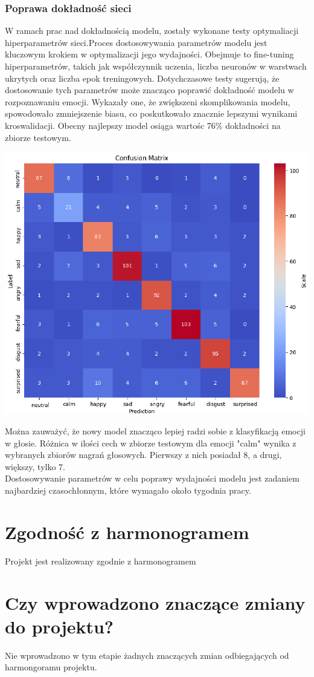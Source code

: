 \documentclass[12pt,titlepage]{article}
\begin{document}
\subsubsection{Poprawa dokładność sieci}
W ramach prac nad dokładnością modelu, zostały wykonane testy optymaliacji hiperparametrów sieci.Proces dostosowywania parametrów modelu jest kluczowym krokiem w optymalizacji jego wydajności. Obejmuje to fine-tuning hiperparametrów, takich jak współczynnik uczenia, liczba neuronów w warstwach ukrytych oraz liczba epok treningowych. Dotychczasowe testy sugerują, że dostosowanie tych parametrów może znacząco poprawić dokładność modelu w rozpoznawaniu emocji. Wykazały one, że zwiększeni skomplikowania modelu, spowodowało zmniejszenie biasu, co poskutkowało znacznie lepszymi wynikami kroswalidacji. Obecny najlepszy model osiąga wartośc 76\% dokładności na zbiorze testowym.
\begin{center}
    \includegraphics[width=\textwidth]{img/conf_matrix.png}
\end{center}
Można zauważyć, że nowy model znacząco lepiej radzi sobie z klasyfikacją emocji w głosie. Różnica w ilości cech w zbiorze testowym dla emocji "calm" wynika z wybranych zbiorów nagrań głosowych. Pierwszy z nich posiadał 8, a drugi, większy, tylko 7.\\ Dostosowywanie parametrów w celu poprawy wydajności modelu jest zadaniem najbardziej czasochłonnym, które wymagało około tygodnia pracy.

\section{Zgodność z harmonogramem}
Projekt jest realizowany zgodnie z harmonogramem
\section{Czy wprowadzono znaczące zmiany do projektu?}
Nie wprowadzono w tym etapie żadnych znaczących zmian odbiegających od harmongoramu projektu.
\end{document}
